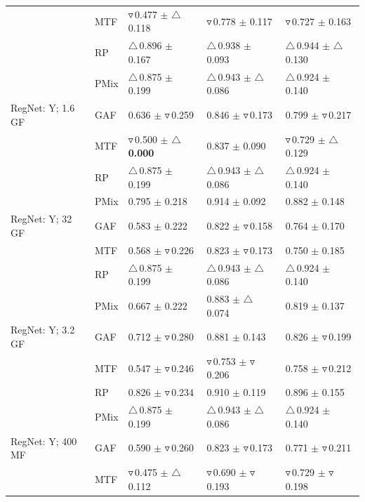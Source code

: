 \documentclass[final,3p,times,twocolumn]{elsarticle}
\newcommand{\purpole}[1]{\textcolor[rgb]{0.7,0.2,0.7}{#1}}
\begin{document}
\begin{table}[t!]
{\begin{tabular}{lllll}
 & MTF & $\triangledown$\,0.477 $\pm$ $\triangle$\,0.118 & $\triangledown$\,0.778 $\pm$ 0.117 & $\triangledown$\,0.727 $\pm$ 0.163 \\
 & RP & $\triangle$\,0.896 $\pm$ 0.167 & $\triangle$\,0.938 $\pm$ 0.093 & $\triangle$\,0.944 $\pm$ $\triangle$\,0.130 \\
 & \purpole{PMix} & $\triangle$\,0.875 $\pm$ 0.199 & $\triangle$\,0.943 $\pm$ $\triangle$\,0.086 & $\triangle$\,0.924 $\pm$ 0.140 \\
RegNet: Y; 1.6 GF & GAF & 0.636 $\pm$ $\triangledown$\,0.259 & 0.846 $\pm$ $\triangledown$\,0.173 & 0.799 $\pm$ $\triangledown$\,0.217 \\
 & MTF & $\triangledown$\,0.500 $\pm$ \textbf{$\triangle$\,0.000} & 0.837 $\pm$ 0.090 & $\triangledown$\,0.729 $\pm$ $\triangle$\,0.129 \\
 & RP & $\triangle$\,0.875 $\pm$ 0.199 & $\triangle$\,0.943 $\pm$ $\triangle$\,0.086 & $\triangle$\,0.924 $\pm$ 0.140 \\
 & \purpole{PMix} & 0.795 $\pm$ 0.218 & 0.914 $\pm$ 0.092 & 0.882 $\pm$ 0.148 \\
RegNet: Y; 32 GF & GAF & 0.583 $\pm$ 0.222 & 0.822 $\pm$ $\triangledown$\,0.158 & 0.764 $\pm$ 0.170 \\
 & MTF & 0.568 $\pm$ $\triangledown$\,0.226 & 0.823 $\pm$ $\triangledown$\,0.173 & 0.750 $\pm$ 0.185 \\
 & RP & $\triangle$\,0.875 $\pm$ 0.199 & $\triangle$\,0.943 $\pm$ $\triangle$\,0.086 & $\triangle$\,0.924 $\pm$ 0.140 \\
 & \purpole{PMix} & 0.667 $\pm$ 0.222 & 0.883 $\pm$ $\triangle$\,0.074 & 0.819 $\pm$ 0.137 \\
RegNet: Y; 3.2 GF & GAF & 0.712 $\pm$ $\triangledown$\,0.280 & 0.881 $\pm$ 0.143 & 0.826 $\pm$ $\triangledown$\,0.199 \\
 & MTF & 0.547 $\pm$ $\triangledown$\,0.246 & $\triangledown$\,0.753 $\pm$ $\triangledown$\,0.206 & 0.758 $\pm$ $\triangledown$\,0.212 \\
 & RP & 0.826 $\pm$ $\triangledown$\,0.234 & 0.910 $\pm$ 0.119 & 0.896 $\pm$ 0.155 \\
 & \purpole{PMix} & $\triangle$\,0.875 $\pm$ 0.199 & $\triangle$\,0.943 $\pm$ $\triangle$\,0.086 & $\triangle$\,0.924 $\pm$ 0.140 \\
RegNet: Y; 400 MF & GAF & 0.590 $\pm$ $\triangledown$\,0.260 & 0.823 $\pm$ $\triangledown$\,0.173 & 0.771 $\pm$ $\triangledown$\,0.211 \\
 & MTF & $\triangledown$\,0.475 $\pm$ $\triangle$\,0.112 & $\triangledown$\,0.690 $\pm$ $\triangledown$\,0.193 & $\triangledown$\,0.729 $\pm$ $\triangledown$\,0.198 \\

\end{tabular}}
\end{table}
\end{document}
